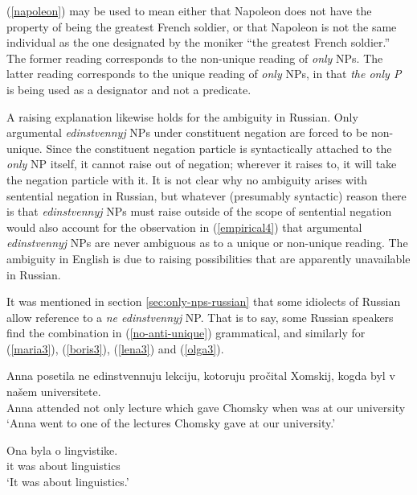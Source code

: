 (\ref{napoleon}) may be used to mean either that Napoleon does not have the property of being the greatest French soldier, or that Napoleon is not the same individual as the one designated by the moniker ``the greatest French soldier.'' The former reading corresponds to the non-unique reading of \textit{only} NPs. The latter reading corresponds to the unique reading of \textit{only} NPs, in that \textit{the only P} is being used as a designator and not a predicate.

A raising explanation likewise holds for the ambiguity in Russian. Only argumental \textit{edinstvennyj} NPs under constituent negation are forced to be non-unique. Since the constituent negation particle is syntactically attached to the \textit{only} NP itself, it cannot raise out of negation; wherever it raises to, it will take the negation particle with it. It is not clear why no ambiguity arises with sentential negation in Russian, but whatever (presumably syntactic) reason there is that \textit{edinstvennyj} NPs must raise outside of the scope of sentential negation would also account for the observation in (\ref{empirical4}) that argumental \textit{edinstvennyj} NPs are never ambiguous as to a unique or non-unique reading. The ambiguity in English is due to raising possibilities that are apparently unavailable in Russian.

It was mentioned in section \ref{sec:only-nps-russian} that some idiolects of Russian allow reference to a \textit{ne edinstvennyj} NP. That is to say, some Russian speakers find the combination in (\ref{no-anti-unique}) grammatical, and similarly for (\ref{maria3}), (\ref{boris3}), (\ref{lena3}) and (\ref{olga3}).

\begin{exe}
	\ex \label{no-anti-unique} \begin{xlist}
		\ex \gll Anna posetila ne edinstvennuju lekciju, kotoruju pro\v{c}ital Xomskij, kogda byl v na\v{s}em universitete.\\
		Anna attended not only lecture which gave Chomsky when was at our university\\
		\glt `Anna went to one of the lectures Chomsky gave at our university.'
		
		\ex \gll Ona byla o lingvistike.\\
		it was about linguistics\\
		\glt `It was about linguistics.'
	\end{xlist}
\end{exe}

